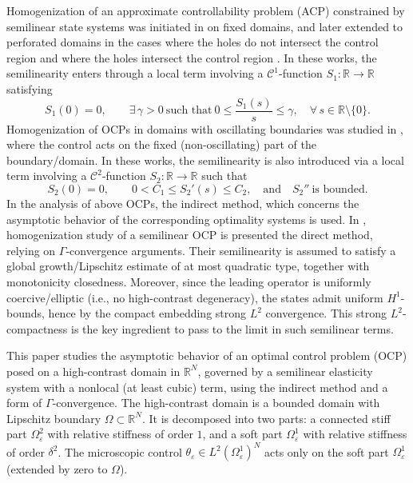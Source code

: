 \documentclass[11pt,a4paper]{article}
\numberwithin{equation}{section}
\def\O{\Omega}
\def\d{\delta}
\def\e{\varepsilon}
\def\C{\mathcal{C}}
\def\R{{\mathbb{R}}}
\def\R{{\mathbb{R}}}
\begin{document}
Homogenization of an approximate controllability problem (ACP) constrained by semilinear state systems was initiated in \cite{Conca01} on fixed domains, and later extended to perforated domains in the cases where the holes do not intersect the control region \cite{Conca02} and where the holes intersect the control region \cite{Conca03}. In these works, the semilinearity enters through a local term involving a $\C^1$-function $S_1:\R\to\R$ satisfying
\begin{equation}\label{N1}
S_1(0)=0,
\qquad
\exists\,\gamma>0 \ \text{such that}\ 
0\le \frac{S_1(s)}{s}\le \gamma,
\quad \forall\, s\in\R\setminus\{0\}.
\end{equation}
Homogenization of OCPs in domains with oscillating boundaries was studied in \cite{Nanda01,Nanda02,Nanda03,Nanda04}, where the control acts on the fixed (non-oscillating) part of the boundary/domain. In these works, the semilinearity is also introduced via a local term involving a $\C^2$-function $S_2:\R\to\R$ such that
\begin{equation}\label{N2}
S_2(0)=0,
\qquad
0<C_1\le S_2'(s)\le C_2,
\quad \text{and}\quad S_2'' \ \text{is bounded}.
\end{equation}
In the analysis of above OCPs, the indirect method, which concerns the
asymptotic behavior of the corresponding optimality systems is used. 
In \cite{NL01}, homogenization study of a semilinear OCP is presented the direct method, relying on $\Gamma$-convergence arguments. Their semilinearity is assumed to satisfy a global growth/Lipschitz estimate of at most quadratic type,
together with monotonicity closedness. Moreover, since the leading operator is uniformly coercive/elliptic (i.e., no high-contrast degeneracy), the states admit uniform $H^1$-bounds, hence by the compact embedding strong $L^2$ convergence. This strong $L^2$-compactness is the key ingredient to pass to the limit in such semilinear terms.


This paper studies the asymptotic behavior of an optimal control problem (OCP) posed on a high-contrast domain in $\R^N$, governed by a semilinear elasticity system with a nonlocal (at least cubic) term, using the indirect method and a form of $\Gamma$-convergence. The high-contrast domain is a bounded domain with Lipschitz boundary $\O\subset \R^N$. It is decomposed into two parts: a connected stiff part $\O^2_\e$ with relative stiffness of order $1$, and a soft part $\O^1_\e$ with relative stiffness of order $\d^2$. The microscopic control $\theta_\e\in L^2(\O^1_\e)^N$ acts only on the soft part $\O^1_\e$ (extended by zero to $\O$).
\end{document}
